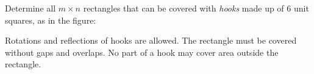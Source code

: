 Determine all $m \times n$ rectangles that can be covered with \emph{hooks} made up of $6$ unit squares, as in the figure:

Rotations and reflections of hooks are allowed. The rectangle must be covered without gaps and overlaps. No part of a hook may cover area outside the rectangle.
